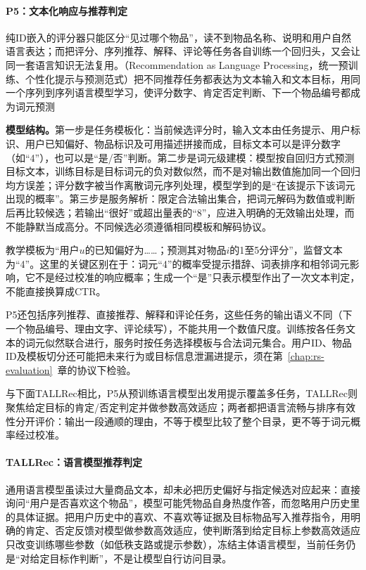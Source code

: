 \paragraph{P5：文本化响应与推荐判定}
\label{sec:rs-p5-scoring}

纯ID嵌入的评分器只能区分“见过哪个物品”，读不到物品名称、说明和用户自然语言表达；而把评分、序列推荐、解释、评论等任务各自训练一个回归头，又会让同一套语言知识无法复用。（Recommendation as Language Processing，统一预训练、个性化提示与预测范式）把不同推荐任务都表达为文本输入和文本目标，用同一个序列到序列语言模型学习，使评分数字、肯定否定判断、下一个物品编号都成为词元预测

\textbf{模型结构。}第一步是任务模板化：当前候选评分时，输入文本由任务提示、用户标识、用户已知偏好、物品标识及可用描述拼接而成，目标文本可以是评分数字（如“4”），也可以是“是/否”判断。第二步是词元级建模：模型按自回归方式预测目标文本，训练目标是目标词元的负对数似然，而不是对输出数值施加同一个回归均方误差；评分数字被当作离散词元序列处理，模型学到的是“在该提示下该词元出现的概率”。第三步是服务解析：限定合法输出集合，把词元解码为数值或判断后再比较候选；若输出“很好”或超出量表的“8”，应进入明确的无效输出处理，而不能静默当成高分。不同候选必须遵循相同模板和解码协议。

教学模板为“用户$u$的已知偏好为……；预测其对物品$i$的1至5分评分”，监督文本为“4”。这里的关键区别在于：词元“4”的概率受提示措辞、词表排序和相邻词元影响，它不是经过校准的响应概率；生成一个“是”只表示模型作出了一次文本判定，不能直接换算成CTR。

P5还包括序列推荐、直接推荐、解释和评论任务，这些任务的输出语义不同（下一个物品编号、理由文字、评论续写），不能共用一个数值尺度。训练按各任务文本的词元似然联合进行，服务时按任务选择模板与合法词元集合。用户ID、物品ID及模板切分还可能把未来行为或目标信息泄漏进提示，须在第~\ref{chap:rs-evaluation}~章的协议下检验。

与下面TALLRec相比，P5从预训练语言模型出发用提示覆盖多任务，TALLRec则聚焦给定目标的肯定/否定判定并做参数高效适应；两者都把语言流畅与排序有效性分开评价：输出一段通顺的理由，不等于模型比较了整个目录，更不等于词元概率经过校准。

\paragraph{TALLRec：语言模型推荐判定}
\label{sec:rs-tallrec}

通用语言模型虽读过大量商品文本，却未必把历史偏好与指定候选对应起来：直接询问“用户是否喜欢这个物品”，模型可能凭物品自身热度作答，而忽略用户历史里的具体证据。把用户历史中的喜欢、不喜欢等证据及目标物品写入推荐指令，用明确的肯定、否定反馈对模型做参数高效适应，使判断落到给定目标上参数高效适应只改变训练哪些参数（如低秩支路或提示参数），冻结主体语言模型，当前任务仍是“对给定目标作判断”，不是让模型自行访问目录。

